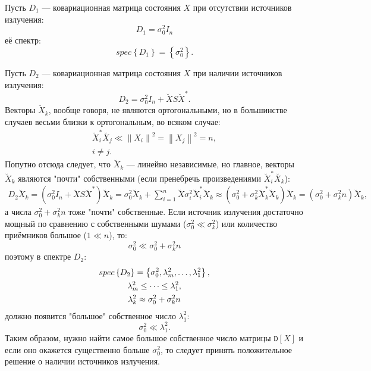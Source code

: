 \documentclass[a4paper,12pt]{article}
\newcommand{\variance}[1]{\mathtt{D} \left[ #1 \right]}
\newcommand{\spectrum}[1]{spec \left \{ #1 \right \}}
\newcommand{\norm}[1]{\left \| #1 \right \|}
\begin{document}
    Пусть $D_1$ --- ковариационная матрица состояния $X$ при отсутствии источников излучения:
    \[
        D_1 = \sigma_0^2 I_n
    \]
    её спектр:
    \[
        \spectrum{D_1} = \left \{ \sigma_0^2 \right \} .
    \]

    Пусть $D_2$ --- ковариационная матрица состояния $X$ при наличии источников излучения:
    \[
        D_2 = \sigma_0^2 I_n + \breve{X} S \breve{X}^* .
    \]
    Векторы $\breve{X}_k$, вообще говоря, не являются ортогональными, но в большинстве случаев весьми близки к ортогональным, во всяком случае:
    \begin{gather*}
        \breve{X}_i^* \breve{X_j} \ll \norm{X_i}^2 = \norm{X_j}^2 = n , \\
        i \neq j .
    \end{gather*}
    Попутно отсюда следует, что $\breve{X}_k$ --- линейно независимые, но главное, векторы $\breve{X}_k$ являются "почти"{} собственными (если пренебречь произведениями
    $\breve{X}_i^* \breve{X_k}$):
    \begin{gather*}
        D_2 \breve{X}_k
        = \left ( \sigma_0^2 I_n + \breve{X} S \breve{X}^* \right ) \breve{X}_k
        = \sigma_0^2 \breve{X}_k + \sum_{i=1}^n \breve{X} \sigma_i^2 \breve{X}_i^* \breve{X}_k
        \approx ( \sigma_0^2 + \sigma_k^2 \breve{X}_k^* \breve{X}_k ) \breve{X}_k
        = ( \sigma_0^2 + \sigma_k^2 n ) \breve{X}_k ,
    \end{gather*}
    а числа $\sigma_0^2 + \sigma_k^2 n$ тоже "почти"{} собственные. Если источник излучения достаточно мощный по сравнению с собственными шумами ($\sigma_0^2 \ll \sigma_k^2$)
    или количество приёмников большое ($1 \ll n$), то:
    \[
        \sigma_0^2 \ll \sigma_0^2 + \sigma_k^2 n
    \]
    поэтому в спектре $D_2$:
    \begin{gather}
        \spectrum{D_2} = \left \{ \sigma_0^2, \lambda_m^2, \dots, \lambda_1^2 \right \} , \notag \\
        \lambda_m^2 \le \dots \le \lambda_1^2 , \notag \\
        \lambda_k^2 \approx \sigma_0^2 + \sigma_k^2 n \label{eigenvalues}
    \end{gather}
    должно появится "большое"{} собственное число $\lambda_1^2$:
    \[
        \sigma_0^2 \ll \lambda_1^2 .
    \]
    Таким образом, нужно найти самое большое собственное число матрицы $\variance{X}$ и если оно окажется существенно больше $\sigma_0^2$, то следует принять положительное
    решение о наличии источников излучения.
\end{document}

